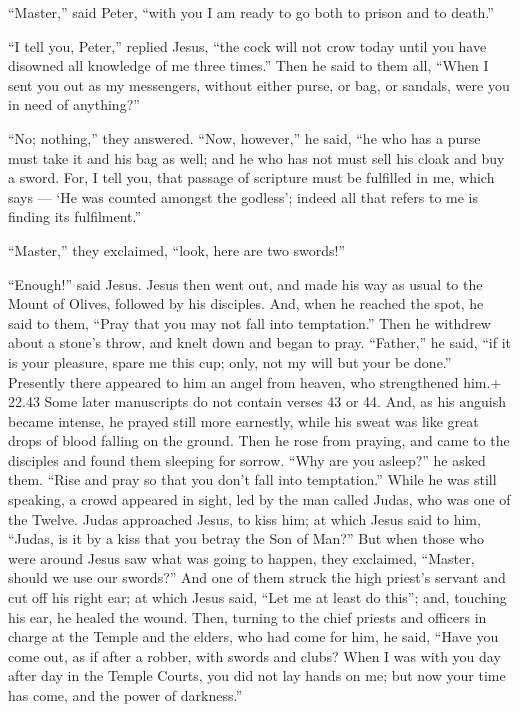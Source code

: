  ``Master,'' said Peter, ``with you I am ready to go both
to prison and to death.''

 ``I tell you, Peter,'' replied Jesus, ``the cock will not
crow today until you have disowned all knowledge of me three times.''
 Then he said to them all, ``When I sent you out as my
messengers, without either purse, or bag, or sandals, were you in need
of anything?''

``No; nothing,'' they answered.  ``Now, however,'' he said,
``he who has a purse must take it and his bag as well; and he who has
not must sell his cloak and buy a sword.  For, I tell you,
that passage of scripture must be fulfilled in me, which says --- `He
was counted amongst the godless'; indeed all that refers to me is
finding its fulfilment.''

 ``Master,'' they exclaimed, ``look, here are two swords!''

``Enough!'' said Jesus.  Jesus then went out, and made his
way as usual to the Mount of Olives, followed by his disciples.
 And, when he reached the spot, he said to them, ``Pray
that you may not fall into temptation.''  Then he withdrew
about a stone's throw, and knelt down and began to pray. 
``Father,'' he said, ``if it is your pleasure, spare me this cup; only,
not my will but your be done.''  Presently there appeared
to him an angel from heaven, who strengthened him.+ 22.43 Some later
manuscripts do not contain verses 43 or 44.  And, as his
anguish became intense, he prayed still more earnestly, while his sweat
was like great drops of blood falling on the ground.  Then
he rose from praying, and came to the disciples and found them sleeping
for sorrow.  ``Why are you asleep?'' he asked them. ``Rise
and pray so that you don't fall into temptation.''  While
he was still speaking, a crowd appeared in sight, led by the man called
Judas, who was one of the Twelve. Judas approached Jesus, to kiss him;
 at which Jesus said to him, ``Judas, is it by a kiss that
you betray the Son of Man?''  But when those who were
around Jesus saw what was going to happen, they exclaimed, ``Master,
should we use our swords?''  And one of them struck the
high priest's servant and cut off his right ear;  at which
Jesus said, ``Let me at least do this''; and, touching his ear, he
healed the wound.  Then, turning to the chief priests and
officers in charge at the Temple and the elders, who had come for him,
he said, ``Have you come out, as if after a robber, with swords and
clubs?  When I was with you day after day in the Temple
Courts, you did not lay hands on me; but now your time has come, and the
power of darkness.''

